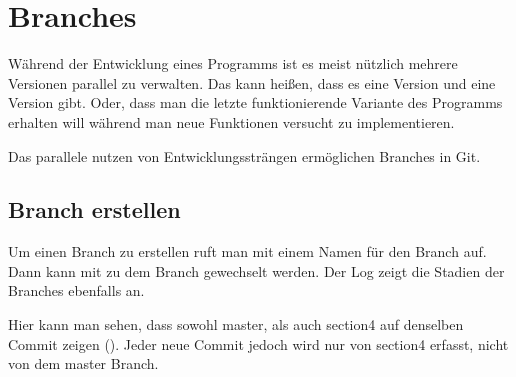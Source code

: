 \section{Branches}\label{sec:branch}
Während der Entwicklung eines Programms ist es meist nützlich mehrere Versionen parallel zu verwalten. Das kann heißen, dass es eine  Version und eine  Version gibt. Oder, dass man die letzte funktionierende Variante des Programms erhalten will während man neue Funktionen versucht zu implementieren.

Das parallele nutzen von Entwicklungssträngen ermöglichen Branches in Git.
\subsection{Branch erstellen}
Um einen Branch zu erstellen ruft man  mit einem Namen für den Branch auf. Dann kann mit  zu dem Branch gewechselt werden. Der Log zeigt die Stadien der Branches ebenfalls an.
Hier kann man sehen, dass sowohl master, als auch section4 auf denselben Commit zeigen (). Jeder neue Commit jedoch wird nur von section4 erfasst, nicht von dem master Branch.

